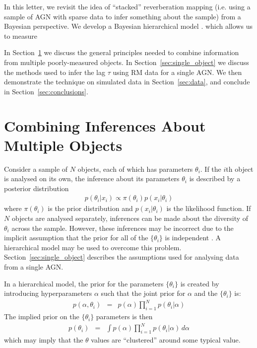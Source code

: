 \documentclass[useAMS,usenatbib]{mn2e}
\begin{document}
In this letter, we revisit the idea of ``stacked'' reverberation mapping (i.e.
using a sample of AGN with sparse data to infer something about the sample)
from a Bayesian perspective. We develop a Bayesian hierarchical model
\citep{loredo, kelly, extreme_deconvolution, 2012AJ....143...90S, 2012arXiv1208.3036L, 2013arXiv1310.5177B, 2013AJ....146....7B}.
which allows us to measure 

In Section~\ref{sec:multiple} we discuss the general principles needed
to combine information from multiple poorly-measured objects.
In Section~\ref{sec:single_object} we discuss the methods used to infer the lag
$\tau$ using RM data for a single AGN. We then demonstrate the technique
on simulated data in Section~\ref{sec:data}, and conclude in
Section~\ref{sec:conclusions}.

\section{Combining Inferences About Multiple Objects}\label{sec:multiple}
Consider a sample of $N$ objects, each of which has parameters $\theta_i$.
If the $i$th object is analysed on its own, the inference about 
its parameters $\theta_i$ is described by a posterior distribution
\begin{eqnarray}
p(\theta_i | x_i) \propto \pi(\theta_i)p(x_i | \theta_i)\label{eq:individual}
\end{eqnarray}
where $\pi(\theta_i)$ is the prior distribution and $p(x_i | \theta_i)$ is the
likelihood function. If $N$ objects are analysed separately, inferences can
be made about the diversity of $\theta_i$ across the sample. However, these
inferences may be incorrect due to the implicit assumption that the prior for
all of the $\{\theta_i\}$ is independent \citep{2013arXiv1310.5177B}.
A hierarchical model may be used to overcome this problem.
Section~\ref{sec:single_object} describes the assumptions used for analysing
data from a single AGN.

In a hierarchical model, the prior for the parameters $\{\theta_i\}$ is created
by introducing hyperparameters $\alpha$ such that the joint prior for $\alpha$
and the $\{\theta_i\}$ is:
\begin{eqnarray}
p(\alpha, \theta_i) &=& p(\alpha)\prod_{i=1}^N p(\theta_i | \alpha)
\end{eqnarray}
The implied prior on the $\{\theta_i\}$ parameters is then
\begin{eqnarray}
p(\theta_i) &=& \int p(\alpha)\prod_{i=1}^N p(\theta_i | \alpha) \, d\alpha
\end{eqnarray}
which may imply that the $\theta$ values are ``clustered'' around some
typical value.
\end{document}
